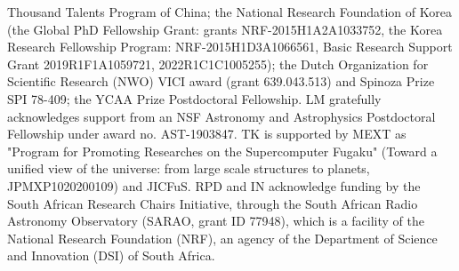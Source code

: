 Thousand Talents Program of China; the National Research
Foundation of Korea (the Global PhD Fellowship
Grant: grants NRF-2015H1A2A1033752, the Korea Research Fellowship Program:
NRF-2015H1D3A1066561, Basic Research Support Grant 2019R1F1A1059721, 2022R1C1C1005255); the Dutch Organization
for Scientific Research (NWO) VICI award
(grant 639.043.513) and Spinoza Prize SPI 78-409; the YCAA Prize Postdoctoral Fellowship.
LM gratefully acknowledges support from an NSF Astronomy and Astrophysics Postdoctoral Fellowship under award no. AST-1903847. TK is supported by MEXT as "Program for Promoting Researches on the Supercomputer Fugaku" (Toward a unified view of the universe: from large scale structures to planets, JPMXP1020200109) and JICFuS. RPD and IN acknowledge funding by the South African Research Chairs Initiative, through the South African Radio Astronomy Observatory (SARAO, grant ID 77948),  which is a facility of the National Research Foundation (NRF), an agency of the Department of Science and Innovation (DSI) of South Africa.

